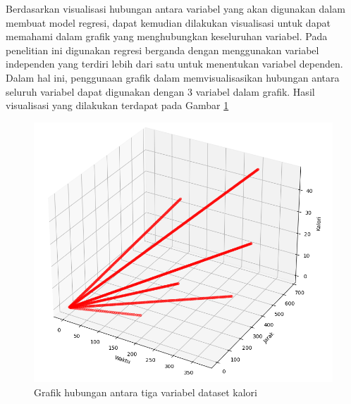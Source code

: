 Berdasarkan visualisasi hubungan antara variabel yang akan digunakan dalam membuat model regresi, dapat kemudian dilakukan visualisasi untuk dapat memahami dalam grafik yang menghubungkan keseluruhan variabel. Pada penelitian ini digunakan regresi berganda dengan menggunakan variabel independen yang terdiri lebih dari satu untuk menentukan variabel dependen. Dalam hal ini, penggunaan grafik dalam memvisualisasikan hubungan antara seluruh variabel dapat digunakan dengan 3 variabel dalam grafik. Hasil visualisasi yang dilakukan terdapat pada Gambar \ref{fig:plotregresilinearnon}

\begin{figure}[H]
  \centering
  \includegraphics[scale=0.47]{gambar/plotregresinon.png}
  \caption{Grafik hubungan antara tiga variabel dataset kalori}
  \label{fig:plotregresilinearnon}
\end{figure}

